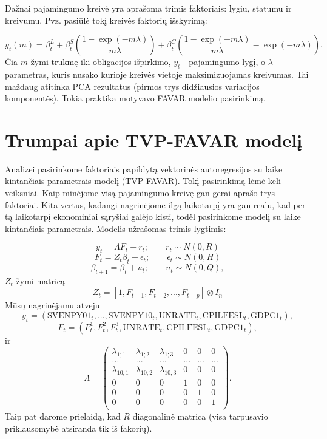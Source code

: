 \documentclass[12pt,lithuanian,]{article}
\begin{document}
Dažnai pajamingumo kreivė yra aprašoma trimis faktoriais: lygiu, statumu
ir kreivumu. Pvz. \citet{NelsonSiegel} pasiūlė tokį kreivės faktorių
išskyrimą:

\[ y_t(m) = \beta^L_t + \beta^S_t \left(\frac{1-\exp(-m \lambda)}{m\lambda}\right) + \beta^C_t \left(\frac{1-\exp(-m \lambda)}{m\lambda} - \exp(-m \lambda)\right).\]
Čia \(m\) žymi trukmę iki obligacijos išpirkimo, \(y_t\) - pajamingumo
lygį, o \(\lambda\) parametras, kuris nusako kurioje kreivės vietoje
maksimizuojamas kreivumas. Tai maždaug atitinka PCA rezultatus (pirmos
trys didžiausios variacijos komponentės). Tokia praktika motyvavo FAVAR
modelio pasirinkimą.

\section{Trumpai apie TVP-FAVAR
modelį}\label{trumpai-apie-tvp-favar-modeli}

Analizei pasirinkome faktoriais papildytą vektorinės autoregresijos su
laike kintančiais parametrais modelį (TVP-FAVAR). Tokį pasirinkimą lėmė
keli veiksniai. Kaip minėjome visą pajamingumo kreivę gan gerai aprašo
trys faktoriai. Kita vertus, kadangi nagrinėjome ilgą laikotarpį yra gan
realu, kad per tą laikotarpį ekonominiai sąryšiai galėjo kisti, todėl
pasirinkome modelį su laike kintančiais parametrais. Modelis užrašomas
trimis lygtimis:

\[ y_t = \Lambda F_t + r_t; \qquad r_t \sim N(0, R) \]
\[ F_t = Z_t \beta_t + \epsilon_t; \qquad \epsilon_t \sim N(0, H) \]
\[ \beta_{t+1} = \beta_t + u_t; \qquad u_t \sim N(0, Q),\] \(Z_t\) žymi
matricą \[ Z_t = [1, F_{t-1}, F_{t-2}, ..., F_{t-p}] \otimes I_n \] Mūsų
nagrinėjamu atveju
\[ y_t = (\text{SVENPY01}_t, ..., \text{SVENPY10}_t, \text{UNRATE}_t, \text{CPILFESL}_t, \text{GDPC1}_t), \]
\[ F_t = (F^1_t, F^2_t, F^3_t, \text{UNRATE}_t, \text{CPILFESL}_t, \text{GDPC1}_t), \]
ir \[ \Lambda = \left( \begin{array}{cccccc}
\lambda_{1;1} & \lambda_{1;2} & \lambda_{1;3} & 0 & 0 & 0 \\
... & ... & ... & ... & ... & ... \\
\lambda_{10;1} & \lambda_{10;2} & \lambda_{10;3} & 0 & 0 & 0 \\
0  & 0 & 0 & 1 & 0 & 0 \\
0  & 0 & 0 & 0 & 1 & 0 \\
0  & 0 & 0 & 0 & 0 & 1 \\
\end{array} \right). \] Taip pat darome prielaidą, kad \(R\) diagonalinė
matrica (visa tarpusavio priklausomybė atsiranda tik iš fakorių).
\end{document}
